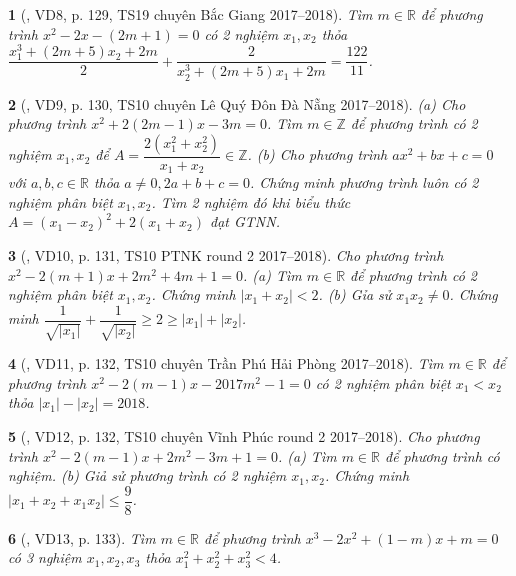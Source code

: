 \documentclass{article}
\newtheorem{baitoan}{}
\begin{document}
\begin{baitoan}[\cite{Thu_Viet_Minh_ptb2}, VD8, p. 129, TS19 chuyên Bắc Giang 2017--2018]
	Tìm $m\in\mathbb{R}$ để phương trình $x^2 - 2x - (2m + 1) = 0$ có 2 nghiệm $x_1,x_2$ thỏa $\dfrac{x_1^3 + (2m + 5)x_2 + 2m}{2} + \dfrac{2}{x_2^3 + (2m + 5)x_1 + 2m} = \dfrac{122}{11}$.
\end{baitoan}

\begin{baitoan}[\cite{Thu_Viet_Minh_ptb2}, VD9, p. 130, TS10 chuyên Lê Quý Đôn Đà Nẵng 2017--2018]
	(a) Cho phương trình $x^2 + 2(2m - 1)x - 3m = 0$. Tìm $m\in\mathbb{Z}$ để phương trình có 2 nghiệm $x_1,x_2$ để $A = \dfrac{2(x_1^2 + x_2^2)}{x_1 + x_2}\in\mathbb{Z}$. (b) Cho phương trình $ax^2 + bx + c = 0$ với $a,b,c\in\mathbb{R}$ thỏa $a\ne0,2a + b + c = 0$. Chứng minh phương trình luôn có 2 nghiệm phân biệt $x_1,x_2$. Tìm 2 nghiệm đó khi biểu thức $A = (x_1 - x_2)^2 + 2(x_1 + x_2)$ đạt {\rm GTNN}.
\end{baitoan}

\begin{baitoan}[\cite{Thu_Viet_Minh_ptb2}, VD10, p. 131, TS10 PTNK round 2 2017--2018]
	Cho phương trình $x^2 - 2(m + 1)x + 2m^2 + 4m + 1 = 0$. (a) Tìm $m\in\mathbb{R}$ để phương trình có 2 nghiệm phân biệt $x_1,x_2$. Chứng minh $\left|x_1 + x_2\right| < 2$. (b) Gỉa sử $x_1x_2\ne0$. Chứng minh $\dfrac{1}{\sqrt{|x_1|}} + \dfrac{1}{\sqrt{|x_2|}}\ge2\ge|x_1| + |x_2|$.
\end{baitoan}

\begin{baitoan}[\cite{Thu_Viet_Minh_ptb2}, VD11, p. 132, TS10 chuyên Trần Phú Hải Phòng 2017--2018]
	Tìm $m\in\mathbb{R}$ để phương trình $x^2 - 2(m - 1)x - 2017m^2 - 1 = 0$ có 2 nghiệm phân biệt $x_1 < x_2$ thỏa $|x_1| - |x_2| = 2018$.
\end{baitoan}

\begin{baitoan}[\cite{Thu_Viet_Minh_ptb2}, VD12, p. 132, TS10 chuyên Vĩnh Phúc round 2 2017--2018]
	Cho phương trình $x^2 - 2(m - 1)x + 2m^2 - 3m + 1 = 0$. (a) Tìm $m\in\mathbb{R}$ để phương trình có nghiệm. (b) Giả sử phương trình có 2 nghiệm $x_1,x_2$. Chứng minh $|x_1 + x_2 + x_1x_2|\le\dfrac{9}{8}$.
\end{baitoan}

\begin{baitoan}[\cite{Thu_Viet_Minh_ptb2}, VD13, p. 133]
	Tìm $m\in\mathbb{R}$ để phương trình $x^3 - 2x^2 + (1 - m)x + m = 0$ có 3 nghiệm $x_1,x_2,x_3$ thỏa $x_1^2 + x_2^2 + x_3^2 < 4$.
\end{baitoan}
\end{document}
